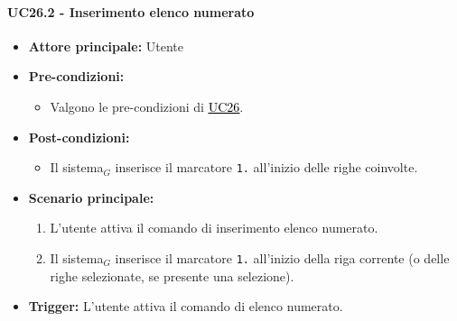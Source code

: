 \documentclass[a4paper, 10pt]{article}
\newcommand{\uclink}[2]{\hyperlink{#1}{\textcolor{black}{\underline{#2}}}}
\begin{document}
\paragraph{UC26.2 - Inserimento elenco numerato}
\hypertarget{uc:26.2}{}
\begin{itemize}
    \item \textbf{Attore principale:} Utente
    \item \textbf{Pre-condizioni:}
        \begin{itemize}
            \item Valgono le pre-condizioni di \uclink{uc:26}{UC26}.
        \end{itemize}
    \item \textbf{Post-condizioni:}
        \begin{itemize}
            \item Il sistema$_G$ inserisce il marcatore \texttt{1.} all'inizio delle righe coinvolte.
        \end{itemize}
    \item \textbf{Scenario principale:}
        \begin{enumerate}
            \item L'utente attiva il comando di inserimento elenco numerato.
            \item Il sistema$_G$ inserisce il marcatore \texttt{1.} all'inizio della riga corrente (o delle righe selezionate, se presente una selezione).
        \end{enumerate}
    \item \textbf{Trigger:} L'utente attiva il comando di elenco numerato.
\end{itemize}
\end{document}
